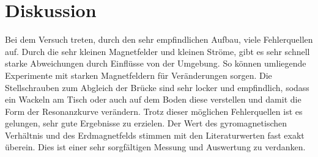 \section{Diskussion}
\label{sec:Diskussion}
Bei dem Versuch treten, durch den sehr empfindlichen Aufbau, viele Fehlerquellen auf. Durch die sehr kleinen Magnetfelder und kleinen Ströme, gibt es sehr schnell starke Abweichungen durch Einflüsse von der Umgebung. So können umliegende Experimente mit starken Magnetfeldern für Veränderungen sorgen.
Die Stellschrauben zum Abgleich der Brücke sind sehr locker und empfindlich, sodass ein Wackeln am Tisch oder auch auf dem Boden diese verstellen und damit die Form der Resonanzkurve verändern. 
Trotz dieser möglichen Fehlerquellen ist es gelungen, sehr gute Ergebnisse zu erzielen.
Der Wert des gyromagnetischen Verhältnis und des Erdmagnetfelds stimmen mit den Literaturwerten fast exakt überein.
Dies ist einer sehr sorgfältigen Messung und Auswertung zu verdanken.
